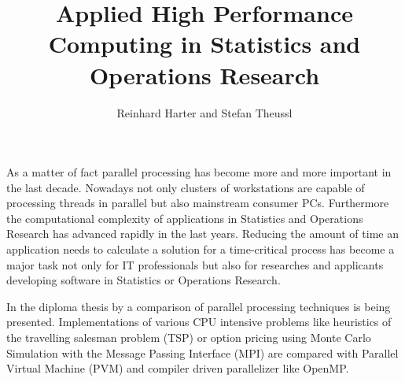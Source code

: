 \documentclass[a4paper,fleqn]{article}
\title{Applied High Performance Computing in Statistics and Operations
Research}
\author{Reinhard Harter and Stefan Theussl}
\begin{document}
As a matter of fact parallel processing has become more and more
important in the last decade. Nowadays not only clusters of
workstations are capable of processing threads in parallel but also
mainstream consumer PCs. Furthermore the computational complexity of
applications in Statistics and Operations Research has advanced
rapidly in the last years. Reducing the amount of time an application
needs to calculate a solution for a time-critical process has become a
major task not only for IT professionals but also for researches and
applicants developing software in Statistics or Operations Research.  


In the diploma thesis by \cite{theussl07} a comparison of parallel
processing techniques is being presented. Implementations of various
CPU intensive problems like heuristics of the travelling salesman
problem (TSP) or option pricing using Monte Carlo Simulation with the
Message Passing Interface (MPI) are compared with 
Parallel Virtual Machine (PVM) and compiler driven parallelizer like
OpenMP.





\end{document}
